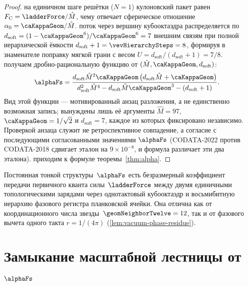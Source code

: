 \begin{proof}
на единичном шаге решётки ($N=1$) кулоновский пакет равен $F_{\mathrm{C}} = \ladderForce / \hat M$, чему отвечает сферическое отношение $\alpha_0 = \caKappaGeom / \hat M$.
поток через вершину кубооктаэдра распределяется по $d_{\mathrm{soft}} = (1-\caKappaGeom^6)/\caKappaGeom^6 = 7$ внешним связям при полной иерархической ёмкости $d_{\mathrm{soft}} + 1 = \vevHierarchySteps = 8$, формируя в знаменателе поправку мягкой грани с весом $U = d_{\mathrm{soft}}/(d_{\mathrm{soft}}+1) = 7/8$.
получаем дробно-рациональную функцию от $(\hat M, \caKappaGeom, d_{\mathrm{soft}})$:
\[
  \alphaFs
  =
  \frac{d_{\mathrm{soft}}\hat M^{2}\caKappaGeom\,\bigl(d_{\mathrm{soft}}\hat M + \caKappaGeom\bigr)}
       {d_{\mathrm{soft}}^{2}\hat M^{4} - d_{\mathrm{soft}}\hat M\caKappaGeom^{3} - (d_{\mathrm{soft}} + 1)}.
\]
Вид этой функции — мотивированный анзац разложения, а не единственно возможная запись; вынуждены лишь её аргументы $\hat M = 97$, $\caKappaGeom = 1/\sqrt{2}$ и $d_{\mathrm{soft}} = 7$, каждое из которых фиксировано независимо. Проверкой анзаца служит не ретроспективное совпадение, а согласие с последующими согласованными значениями $\alphaFs$ (CODATA-2022 против CODATA-2018 сдвигает эталон на $9\times 10^{-8}$, и формула различает эти два эталона).
приходим к формуле теоремы~\ref{thm:alpha}.
\end{proof}

\begin{definition}
\label{def:alpha-meaning}
Постоянная тонкой структуры~$\alphaFs$ есть безразмерный коэффициент передачи первичного кванта силы~$\ladderForce$ между двумя единичными топологическими зарядами через однотактовый кубооктаэдр и восьмибитную иерархию фазового регистра планковской ячейки.
Она отлична как от координационного числа звезды~$\geomNeighborTwelve = 12$, так и от фазового вычета одного такта $r = 1/(4\pi)$ (\cref{lem:vacuum-phase-residue}).
\end{definition}

\section{Замыкание масштабной лестницы от $\alphaFs$}

